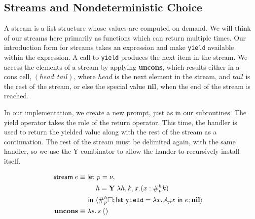 \documentclass[11pt]{article}
\newcommand{\maybePage}{\newpage}
\newcommand\x{\lambda x}
\newcommand{\letin}[2]{\textsf{let }#1\textsf{ in }#2}
\newcommand\A{\mathcal{A}}
\newcommand{\angles}[1]{\langle#1\rangle}
\begin{document}
%
%

\maybePage
\subsection{Streams and Nondeterministic Choice}

A stream is a list structure whose values are computed on demand.\cite{SICP}
We will think of our streams here primarily as functions which can return multiple times.
Our introduction form for streams takes an expression and make \texttt{yield} available within the expression.
A call to \texttt{yield} produces the next item in the stream.
We access the elements of a stream by applying \textbf{uncons}, which results either in a cons cell, $(head:tail)$, where $head$ is the next element in the stream, and $tail$ is the rest of the stream, or else the special value \textbf{nil}, when the end of the stream is reached.

In our implementation, we create a new prompt, just as in our subroutines.
The yield operator takes the role of the return operator.
This time, the handler is used to return the yielded value along with the rest of the stream as a continuation.
The rest of the stream must be delimited again, with the same handler, so we use the Y-combinator to allow the hander to recursively install itself.

\begin{align*}
\textsf{stream}\;e &\equiv{}
\textsf{let }p = \nu, \\
  &\qquad\;\; h = \textbf Y\;\lambda h,k,x.(x:\#_p^hk) \\
  &\quad\;\,\textsf{in }
  \angles{\#_p^{h}\square; \letin{\texttt{yield}=\x.{\A_px}}{e}; \textbf{nil}} \\
\textbf{uncons} &\equiv \lambda s.\,s\;() \\
\end{align*}
\end{document}
